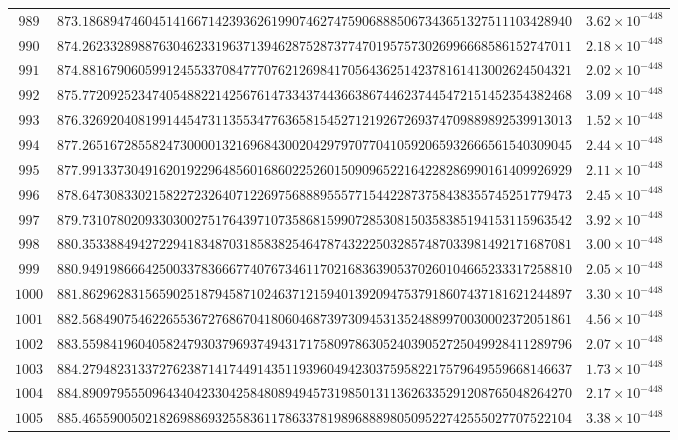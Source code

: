 \documentclass[12pt,reqno]{amsart}
\theoremstyle{remark}
\begin{document}
\begin{longtable}{clc}
$989$ & $873.1868947460451416671423936261990746274759068885067343651327511103428940$ & $3.62\times 10^{-448}$ \\
$990$ & $874.2623328988763046233196371394628752873774701957573026996668586152747011$ & $2.18\times 10^{-448}$ \\
$991$ & $874.8816790605991245533708477707621269841705643625142378161413002624504321$ & $2.02\times 10^{-448}$ \\
$992$ & $875.7720925234740548822142567614733437443663867446237445472151452354382468$ & $3.09\times 10^{-448}$ \\
$993$ & $876.3269204081991445473113553477636581545271219267269374709889892539913013$ & $1.52\times 10^{-448}$ \\
$994$ & $877.2651672855824730000132169684300204297970770410592065932666561540309045$ & $2.44\times 10^{-448}$ \\
$995$ & $877.9913373049162019229648560168602252601509096522164228286990161409926929$ & $2.11\times 10^{-448}$ \\
$996$ & $878.6473083302158227232640712269756888955577154422873758438355745251779473$ & $2.45\times 10^{-448}$ \\
$997$ & $879.7310780209330300275176439710735868159907285308150358385194153115963542$ & $3.92\times 10^{-448}$ \\
$998$ & $880.3533884942722941834870318583825464787432225032857487033981492171687081$ & $3.00\times 10^{-448}$ \\
$999$ & $880.9491986664250033783666774076734611702168363905370260104665233317258810$ & $2.05\times 10^{-448}$ \\
$1000$ & $881.8629628315659025187945871024637121594013920947537918607437181621244897$ & $3.30\times 10^{-448}$ \\
$1001$ & $882.5684907546226553672768670418060468739730945313524889970030002372051861$ & $4.56\times 10^{-448}$ \\
$1002$ & $883.5598419604058247930379693749431717580978630524039052725049928411289796$ & $2.07\times 10^{-448}$ \\
$1003$ & $884.2794823133727623871417449143511939604942303759582217579649559668146637$ & $1.73\times 10^{-448}$ \\
$1004$ & $884.8909795550964340423304258480894945731985013113626335291208765048264270$ & $2.17\times 10^{-448}$ \\
$1005$ & $885.4655900502182698869325583611786337819896888980509522742555027707522104$ & $3.38\times 10^{-448}$ \\

\end{longtable}
\end{document}
